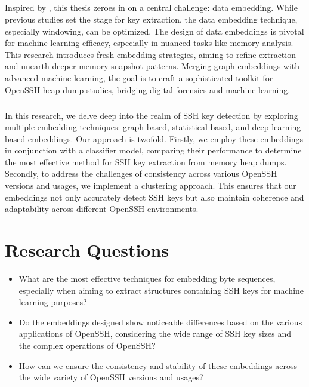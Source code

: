 \paragraph*{}Inspired by , this thesis zeroes in on a central challenge: data embedding. While previous studies set the stage for key extraction, the data embedding technique, especially windowing, can be optimized. The design of data embeddings is pivotal for machine learning efficacy, especially in nuanced tasks like memory analysis. This research introduces fresh embedding strategies, aiming to refine extraction and unearth deeper memory snapshot patterns. Merging graph embeddings with advanced machine learning, the goal is to craft a sophisticated toolkit for OpenSSH heap dump studies, bridging digital forensics and machine learning.

\paragraph{}In this research, we delve deep into the realm of SSH key detection by exploring multiple embedding techniques: graph-based, statistical-based, and deep learning-based embeddings. Our approach is twofold. Firstly, we employ these embeddings in conjunction with a classifier model, comparing their performance to determine the most effective method for SSH key extraction from memory heap dumps. Secondly, to address the challenges of consistency across various OpenSSH versions and usages, we implement a clustering approach. This ensures that our embeddings not only accurately detect SSH keys but also maintain coherence and adaptability across different OpenSSH environments.


\chapter{Research Questions}

\begin{itemize}
    \item What are the most effective techniques for embedding byte sequences, especially when aiming to extract structures containing SSH keys for machine learning purposes?
    \item Do the embeddings designed show noticeable differences based on the various applications of OpenSSH, considering the wide range of SSH key sizes and the complex operations of OpenSSH?
    \item How can we ensure the consistency and stability of these embeddings across the wide variety of OpenSSH versions and usages?
\end{itemize}

